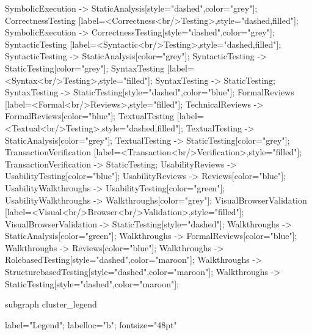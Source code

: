 \documentclass{article}
\begin{document}
{SymbolicExecution -> StaticAnalysis[style="dashed",color="grey"];
CorrectnessTesting [label=<Correctness<br/>Testing>,style="dashed,filled"];
SymbolicExecution -> CorrectnessTesting[style="dashed",color="grey"];
SyntacticTesting [label=<Syntactic<br/>Testing>,style="dashed,filled"];
SyntacticTesting -> StaticAnalysis[color="grey"];
SyntacticTesting -> StaticTesting[color="grey"];
SyntaxTesting [label=<Syntax<br/>Testing>,style="filled"];
SyntaxTesting -> StaticTesting;
SyntaxTesting -> StaticTesting[style="dashed",color="blue"];
FormalReviews [label=<Formal<br/>Reviews>,style="filled"];
TechnicalReviews -> FormalReviews[color="blue"];
TextualTesting [label=<Textual<br/>Testing>,style="dashed,filled"];
TextualTesting -> StaticAnalysis[color="grey"];
TextualTesting -> StaticTesting[color="grey"];
TransactionVerification [label=<Transaction<br/>Verification>,style="filled"];
TransactionVerification -> StaticTesting;
UsabilityReviews -> UsabilityTesting[color="blue"];
UsabilityReviews -> Reviews[color="blue"];
UsabilityWalkthroughs -> UsabilityTesting[color="green"];
UsabilityWalkthroughs -> Walkthroughs[color="grey"];
VisualBrowserValidation [label=<Visual<br/>Browser<br/>Validation>,style="filled"];
VisualBrowserValidation -> StaticTesting[style="dashed"];
Walkthroughs -> StaticAnalysis[color="green"];
Walkthroughs -> FormalReviews[color="blue"];
Walkthroughs -> Reviews[color="blue"];
Walkthroughs -> RolebasedTesting[style="dashed",color="maroon"];
Walkthroughs -> StructurebasedTesting[style="dashed",color="maroon"];
Walkthroughs -> StaticTesting[style="dashed",color="maroon"];

subgraph cluster_legend {

    label="Legend";
    labelloc="b";
    fontsize="48pt"

}}
\end{document}
